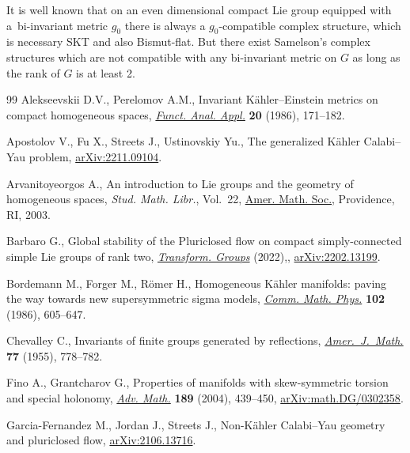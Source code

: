 \documentclass[11pt]{article}
\numberwithin{equation}{section}
\numberwithin{equation}{section}
\begin{document}
\begin{Remark} It is well known that on an even dimensional compact Lie group equipped with a~bi-invariant metric $g_0$ there is always a $g_0$-compatible complex structure, which is necessary SKT and also Bismut-flat. But there exist Samelson's complex structures which are not compatible with any bi-invariant metric on $G$ as long as the rank of $G$ is at least 2.
\end{Remark}
\begin{thebibliography}{99}
Alekseevskii D.V., Perelomov A.M., Invariant {K}\"ahler--{E}instein metrics on
 compact homogeneous spaces, \href{https://doi.org/10.1007/BF01078469}{\textit{Funct. Anal. Appl.}} \textbf{20} (1986),
 171--182.

Apostolov V., Fu X., Streets J., Ustinovskiy Yu., The generalized K\"ahler
 Calabi--Yau problem, \href{https://arxiv.org/abs/2211.09104}{arXiv:2211.09104}.

Arvanitoyeorgos A., An introduction to {L}ie groups and the geometry of
 homogeneous spaces, \textit{Stud. Math. Libr.}, Vol.~22, \href{https://doi.org/10.1090/stml/022}{Amer. Math. Soc.},
 Providence, RI, 2003.

Barbaro G., Global stability of the {P}luriclosed flow on compact
 simply-connected simple {L}ie groups of rank two, \href{https://doi.org/10.1007/s00031-022-09761-5}{\textit{Transform. Groups}}
 (2022),, \href{https://arxiv.org/abs/2202.13199}{arXiv:2202.13199}.

Bordemann M., Forger M., R\"omer H., Homogeneous {K}\"ahler manifolds: paving
 the way towards new supersymmetric sigma models, \href{https://doi.org/10.1007/BF01221650}{\textit{Comm. Math. Phys.}}
 \textbf{102} (1986), 605--647.

Chevalley C., Invariants of finite groups generated by reflections,
 \href{https://doi.org/10.2307/2372597}{\textit{Amer.~J.~Math.}} \textbf{77} (1955), 778--782.

Fino A., Grantcharov G., Properties of manifolds with skew-symmetric torsion
 and special holonomy, \href{https://doi.org/10.1016/j.aim.2003.10.009}{\textit{Adv. Math.}} \textbf{189} (2004), 439--450,
 \href{https://arxiv.org/abs/math.DG/0302358}{arXiv:math.DG/0302358}.

Garcia-Fernandez M., Jordan J., Streets J., Non-{K}\"ahler {C}alabi--{Y}au
 geometry and pluriclosed flow, \href{https://arxiv.org/abs/2106.13716}{arXiv:2106.13716}.


\end{thebibliography}
\end{document}
